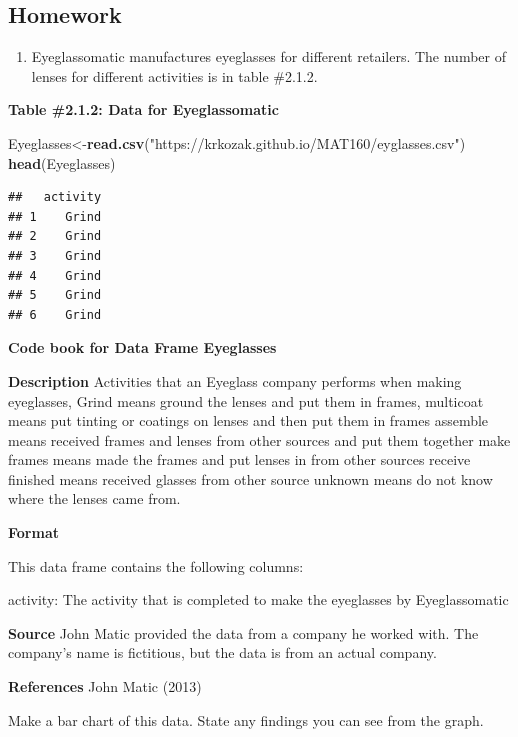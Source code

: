\documentclass[]{book}
\newenvironment{Shaded}{\begin{snugshade}}{\end{snugshade}}
\newcommand{\KeywordTok}[1]{\textcolor[rgb]{0.13,0.29,0.53}{\textbf{#1}}}
\newcommand{\NormalTok}[1]{#1}
\newcommand{\StringTok}[1]{\textcolor[rgb]{0.31,0.60,0.02}{#1}}
\providecommand{\tightlist}{%
  \setlength{\itemsep}{0pt}\setlength{\parskip}{0pt}}
\begin{document}
\hypertarget{homework-4}{%
\subsection{Homework}\label{homework-4}}

\begin{enumerate}
\def\labelenumi{\arabic{enumi}.}
\tightlist
\item
  Eyeglassomatic manufactures eyeglasses for different retailers. The number of lenses for different activities is in table \#2.1.2.
\end{enumerate}

\textbf{Table \#2.1.2: Data for Eyeglassomatic}

\begin{Shaded}
\begin{Highlighting}[]
\NormalTok{Eyeglasses<-}\KeywordTok{read.csv}\NormalTok{(}\StringTok{"https://krkozak.github.io/MAT160/eyglasses.csv"}\NormalTok{)}
\KeywordTok{head}\NormalTok{(Eyeglasses)}
\end{Highlighting}
\end{Shaded}

\begin{verbatim}
##   activity
## 1    Grind
## 2    Grind
## 3    Grind
## 4    Grind
## 5    Grind
## 6    Grind
\end{verbatim}

\textbf{Code book for Data Frame Eyeglasses}

\textbf{Description}
Activities that an Eyeglass company performs when making eyeglasses, Grind means ground the lenses and put them in frames, multicoat means put tinting or coatings on lenses and then put them in frames
assemble means received frames and lenses from other sources and put them together make frames means made the frames and put lenses in from other sources receive finished means received glasses from other source unknown means do not know where the lenses came from.

\textbf{Format}

This data frame contains the following columns:

activity: The activity that is completed to make the eyeglasses by Eyeglassomatic

\textbf{Source}
John Matic provided the data from a company he worked with. The company's name is fictitious, but the data is from an actual company.

\textbf{References}
John Matic (2013)

Make a bar chart of this data. State any findings you can see from the graph.
\end{document}
